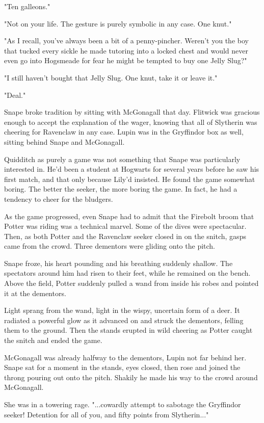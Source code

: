 \documentclass[a4paper,11pt]{article}
\begin{document}
"Ten galleons."

"Not on your life. The gesture is purely symbolic in any case. One knut."

"As I recall, you've always been a bit of a penny-pincher. Weren't you the boy that tucked every sickle he made tutoring into a locked chest and would never even go into Hogsmeade for fear he might be tempted to buy one Jelly Slug?"

"I still haven't bought that Jelly Slug. One knut, take it or leave it."

"Deal."

Snape broke tradition by sitting with McGonagall that day. Flitwick was gracious enough to accept the explanation of the wager, knowing that all of Slytherin was cheering for Ravenclaw in any case. Lupin was in the Gryffindor box as well, sitting behind Snape and McGonagall.

Quidditch as purely a game was not something that Snape was particularly interested in. He'd been a student at Hogwarts for several years before he saw his first match, and that only because Lily'd insisted. He found the game somewhat boring. The better the seeker, the more boring the game. In fact, he had a tendency to cheer for the bludgers.

As the game progressed, even Snape had to admit that the Firebolt broom that Potter was riding was a technical marvel. Some of the dives were spectacular. Then, as both Potter and the Ravenclaw seeker closed in on the snitch, gasps came from the crowd. Three dementors were gliding onto the pitch.

Snape froze, his heart pounding and his breathing suddenly shallow. The spectators around him had risen to their feet, while he remained on the bench. Above the field, Potter suddenly pulled a wand from inside his robes and pointed it at the dementors.

Light sprang from the wand, light in the wispy, uncertain form of a deer. It radiated a powerful glow as it advanced on and struck the dementors, felling them to the ground. Then the stands erupted in wild cheering as Potter caught the snitch and ended the game.

McGonagall was already halfway to the dementors, Lupin not far behind her. Snape sat for a moment in the stands, eyes closed, then rose and joined the throng pouring out onto the pitch. Shakily he made his way to the crowd around McGonagall.

She was in a towering rage. "...cowardly attempt to sabotage the Gryffindor seeker! Detention for all of you, and fifty points from Slytherin..."
\end{document}
